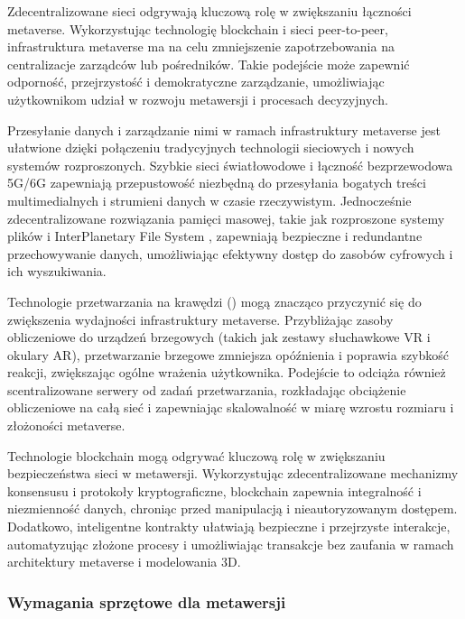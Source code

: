 Zdecentralizowane sieci odgrywają kluczową rolę w zwiększaniu łączności metaverse. Wykorzystując technologię blockchain i sieci peer-to-peer, infrastruktura metaverse ma na celu zmniejszenie zapotrzebowania na centralizacje zarządców lub pośredników. Takie podejście może zapewnić odporność, przejrzystość i demokratyczne zarządzanie, umożliwiając użytkownikom udział w rozwoju metawersji i procesach decyzyjnych\cite{metaverseInfrastructureIEEE}.

Przesyłanie danych i zarządzanie nimi w ramach infrastruktury metaverse jest ułatwione dzięki połączeniu tradycyjnych technologii sieciowych i nowych systemów rozproszonych. Szybkie sieci światłowodowe i łączność bezprzewodowa 5G/6G zapewniają przepustowość niezbędną do przesyłania bogatych treści multimedialnych i strumieni danych w czasie rzeczywistym. Jednocześnie zdecentralizowane rozwiązania pamięci masowej, takie jak rozproszone systemy plików i InterPlanetary File System , zapewniają bezpieczne i redundantne przechowywanie danych, umożliwiając efektywny dostęp do zasobów cyfrowych i ich wyszukiwania\cite{metaverseInfrastructureIEEE}.

Technologie przetwarzania na krawędzi () mogą znacząco przyczynić się do zwiększenia wydajności infrastruktury metaverse. Przybliżając zasoby obliczeniowe do urządzeń brzegowych (takich jak zestawy słuchawkowe VR i okulary AR), przetwarzanie brzegowe zmniejsza opóźnienia i poprawia szybkość reakcji, zwiększając ogólne wrażenia użytkownika. Podejście to odciąża również scentralizowane serwery od zadań przetwarzania, rozkładając obciążenie obliczeniowe na całą sieć i zapewniając skalowalność w miarę wzrostu rozmiaru i złożoności metaverse\cite{metaverseInfrastructureIEEE}.

Technologie blockchain mogą odgrywać kluczową rolę w zwiększaniu bezpieczeństwa sieci w metawersji. Wykorzystując zdecentralizowane mechanizmy konsensusu i protokoły kryptograficzne, blockchain zapewnia integralność i niezmienność danych, chroniąc przed manipulacją i nieautoryzowanym dostępem. Dodatkowo, inteligentne kontrakty ułatwiają bezpieczne i przejrzyste interakcje, automatyzując złożone procesy i umożliwiając transakcje bez zaufania w ramach architektury metaverse i modelowania 3D\cite{metaverseInfrastructureIEEE}.

\subsubsection{Wymagania sprzętowe dla metawersji}

